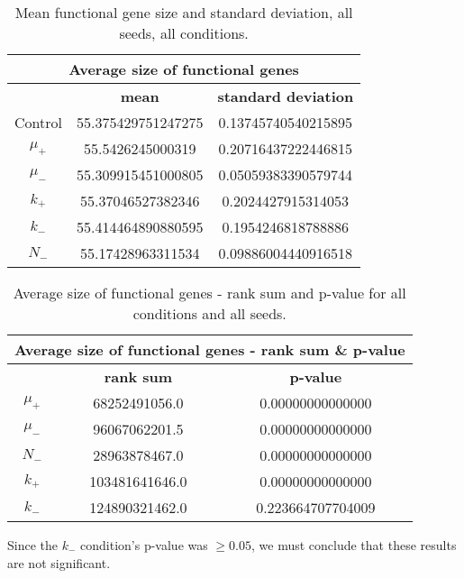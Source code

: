 \begin{table}[H]
	\centering
	\begin{tabular}{|c|c|c|}
		\hline
		\multicolumn{3}{c}{\Large \textbf{Average size of functional genes}} \\
		\hline
		& \textbf{mean} & \textbf{standard deviation} \\
		\hline
		Control & 55.375429751247275 & 0.13745740540215895 \\
		\hline
		$\mu_+$ & 55.5426245000319 & 0.20716437222446815\\ 
		\hline
		$\mu_-$ & 55.309915451000805 & 0.05059383390579744 \\
		\hline
		$k_+$ & 55.37046527382346 & 0.2024427915314053 \\
		\hline
		$k_-$ & 55.414464890880595 & 0.1954246818788886 \\
		\hline
		$N_-$ & 55.17428963311534	& 0.09886004440916518 \\
		\hline
	\end{tabular}
	\caption[Mean functional gene size and standard deviation]{Mean functional gene size and standard deviation, all seeds, all conditions.}
	\label{table:mean_functional_gene_size_and_std_dev}
\end{table}

\begin{table}[H]
	\begin{tabular}{|c|c|c|}
		\hline
		\multicolumn{3}{c}{\Large \textbf{Average size of functional genes - rank sum \& p-value}} \\
		\hline
		& \textbf{rank sum} & \textbf{p-value} \\
		\hline
		$\mu_+$ & 68252491056.0 & 0.00000000000000 \\
		\hline
		$\mu_-$ & 96067062201.5 & 0.00000000000000 \\
		\hline
		$N_-$ & 28963878467.0 & 0.00000000000000 \\
		\hline
		$k_+$ & 103481641646.0 & 0.00000000000000 \\
		\hline
		$k_-$ & 124890321462.0 & 0.223664707704009 \\
		\hline
	\end{tabular}
	\caption[Average size of functional genes - rank sum and p-value]{Average size of functional genes - rank sum and p-value for all conditions and all seeds.}
	\label{table:avg_size_of_functional_genes_rank_sum_and_p-value}
\end{table}
Since the $k_-$ condition's p-value was $\geq0.05$, we must conclude that these results are not significant. 


